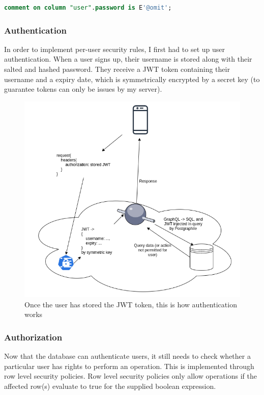 \documentclass{l4proj}
\begin{document}
\begin{lstlisting}[language=SQL, caption={This comment tells Postgraphile to omit password fields} ]
comment on column "user".password is E'@omit';
\end{lstlisting}

\subsubsection{Authentication}
In order to implement per-user security rules, I first had to set up user authentication. When a user signs up, their username is stored along with their salted and hashed password. They receive a JWT token containing their username and a expiry date, which is symmetrically encrypted by a secret key (to guarantee tokens can only be issues by my server). 

\begin{figure}[H]
    \centering
    \includegraphics[width=1.0\linewidth]{authentication.png}    
    \caption{
  Once the user has stored the JWT token, this is how authentication works
    }
\end{figure}


\subsubsection{Authorization}
Now that the database can authenticate users, it still needs to check whether a particular user has rights to perform an operation. This is implemented through row level security policies. Row level security policies only allow operations if the affected row(s) evaluate to true for the supplied boolean expression.
\end{document}
